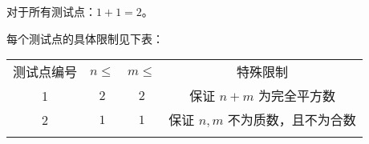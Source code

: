 对于所有测试点：$1+1=2$。

每个测试点的具体限制见下表：
\begin{center}
  \begin{tabular}{c|c|c|c}
    \Xhline{5\arrayrulewidth}
    测试点编号 & $n\leq$ & $m\leq$ & 特殊限制                \\
    \Xhline{3\arrayrulewidth}
    1     & $2$     & $2$     & 保证 $n+m$ 为完全平方数     \\
    \hline
    2     & $1$     & $1$     & 保证 $n,m$ 不为质数，且不为合数 \\
    \Xhline{5\arrayrulewidth}
  \end{tabular}
\end{center}